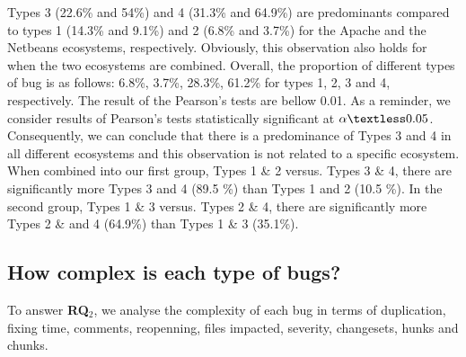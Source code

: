 Types 3 (22.6\% and 54\%) and 4 (31.3\% and 64.9\%) are predominants compared to types 1 (14.3\% and 9.1\%) and 2 (6.8\% and 3.7\%) for the Apache and the Netbeans ecosystems, respectively.
Obviously, this observation also holds for when the two ecosystems are combined.
Overall, the proportion of different types of bug is as follows: 6.8\%, 3.7\%, 28.3\%, 61.2\% for types 1, 2, 3 and 4, respectively.
The result of the Pearson's tests are bellow 0.01.
As a reminder, we consider results of Pearson's tests statistically significant at $\alpha \textless0.05$.
Consequently, we can conclude that there is a predominance of Types 3 and 4 in all different ecosystems and this observation is not related to a specific ecosystem.
When combined into our first group, Types 1 \& 2 versus. Types 3 \& 4, there are significantly more Types 3 and 4 (89.5 \%) than Types 1 and 2 (10.5 \%).
In the second group, Types 1 \& 3 versus. Types 2 \& 4, there are significantly more Types 2 \& and 4 (64.9\%) than Types 1 \& 3 (35.1\%).



\subsection{How complex is each type of bugs?}

To answer {\bf RQ$_2$}, we analyse the complexity of each bug in terms of duplication, fixing time, comments, reopenning, files impacted, severity, changesets, hunks and chunks.

